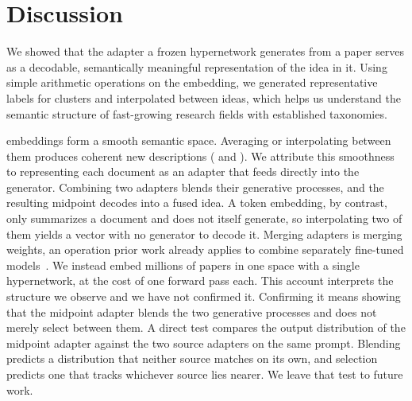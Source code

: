 \section{Discussion}
\label{sec:discussion}

We showed that the adapter a frozen \doctolora hypernetwork generates from a paper serves as a decodable, semantically meaningful representation of the idea in it.
Using simple arithmetic operations on the embedding, we generated representative labels for clusters and interpolated between ideas, which helps us understand the semantic structure of fast-growing research fields with established taxonomies.

\doctolora embeddings form a smooth semantic space. Averaging or interpolating between them produces coherent new descriptions ( and ). We attribute this smoothness to representing each document as an adapter that feeds directly into the generator. Combining two adapters blends their generative processes, and the resulting midpoint decodes into a fused idea. A token embedding, by contrast, only summarizes a document and does not itself generate, so interpolating two of them yields a vector with no generator to decode it. Merging adapters is merging weights, an operation prior work already applies to combine separately fine-tuned models~\citep{wortsman2022soups,ilharco2023task,nylund2024time}. We instead embed millions of papers in one space with a single hypernetwork, at the cost of one forward pass each.
This account interprets the structure we observe and we have not confirmed it. Confirming it means showing that the midpoint adapter blends the two generative processes and does not merely select between them. A direct test compares the output distribution of the midpoint adapter against the two source adapters on the same prompt. Blending predicts a distribution that neither source matches on its own, and selection predicts one that tracks whichever source lies nearer. We leave that test to future work.


